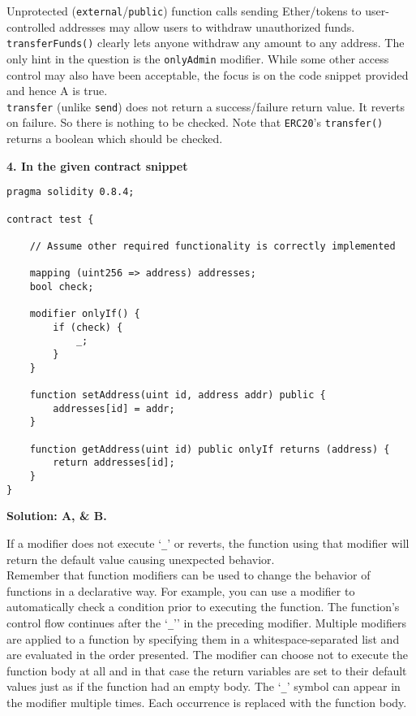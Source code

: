 Unprotected (\verb|external|/\verb|public|) function calls sending Ether/tokens to user-controlled addresses may allow users to withdraw unauthorized funds.\\

\verb|transferFunds()| clearly lets anyone withdraw any amount to any address.
The only hint in the question is the \verb|onlyAdmin| modifier.
While some other access control may also have been acceptable, the focus is on the code snippet provided and hence A is true.\\

\verb|transfer| (unlike \verb|send|) does not return a success/failure return value.
It reverts on failure.
So there is nothing to be checked.
Note that \verb|ERC20|'s \verb|transfer()| returns a boolean which should be checked.\\

\pagebreak

\textbf{4. In the given contract snippet}\label{sec:exam4_q4}\\

\begin{lstlisting}[language=Solidity, style=solStyle]
pragma solidity 0.8.4;

contract test {

    // Assume other required functionality is correctly implemented

    mapping (uint256 => address) addresses;
    bool check;

    modifier onlyIf() {
        if (check) {
            _;
        }
    }

    function setAddress(uint id, address addr) public {
        addresses[id] = addr;
    }

    function getAddress(uint id) public onlyIf returns (address) {
        return addresses[id];
    }
}
\end{lstlisting}

\textbf{Solution: A, \& B.}

If a modifier does not execute `\verb|_|' or reverts, the function using that modifier will return the default value causing unexpected behavior.\\


Remember that function modifiers can be used to change the behavior of functions in a declarative way.
For example, you can use a modifier to automatically check a condition prior to executing the function.
The function's control flow continues after the `\verb|_|'' in the preceding modifier.
Multiple modifiers are applied to a function by specifying them in a whitespace-separated list and are evaluated in the order presented.
The modifier can choose not to execute the function body at all and in that case the return variables are set to their default values just as if the function had an empty body.
The `\verb|_|' symbol can appear in the modifier multiple times.
Each occurrence is replaced with the function body.\\

